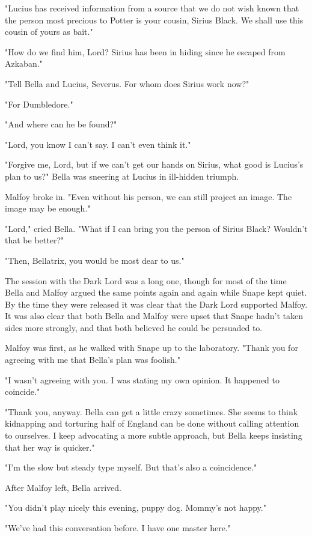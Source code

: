 \documentclass[a4paper,11pt]{article}
\begin{document}
"Lucius has received information from a source that we do not wish known that the person most precious to Potter is your cousin, Sirius Black. We shall use this cousin of yours as bait."

"How do we find him, Lord? Sirius has been in hiding since he escaped from Azkaban."

"Tell Bella and Lucius, Severus. For whom does Sirius work now?"

"For Dumbledore."

"And where can he be found?"

"Lord, you know I can't say. I can't even think it."

"Forgive me, Lord, but if we can't get our hands on Sirius, what good is Lucius's plan to us?" Bella was sneering at Lucius in ill-hidden triumph.

Malfoy broke in. "Even without his person, we can still project an image. The image may be enough."

"Lord," cried Bella. "What if I can bring you the person of Sirius Black? Wouldn't that be better?"

"Then, Bellatrix, you would be most dear to us."

The session with the Dark Lord was a long one, though for most of the time Bella and Malfoy argued the same points again and again while Snape kept quiet. By the time they were released it was clear that the Dark Lord supported Malfoy. It was also clear that both Bella and Malfoy were upset that Snape hadn't taken sides more strongly, and that both believed he could be persuaded to.

Malfoy was first, as he walked with Snape up to the laboratory. "Thank you for agreeing with me that Bella's plan was foolish."

"I wasn't agreeing with you. I was stating my own opinion. It happened to coincide."

"Thank you, anyway. Bella can get a little crazy sometimes. She seems to think kidnapping and torturing half of England can be done without calling attention to ourselves. I keep advocating a more subtle approach, but Bella keeps insisting that her way is quicker."

"I'm the slow but steady type myself. But that's also a coincidence."

After Malfoy left, Bella arrived.

"You didn't play nicely this evening, puppy dog. Mommy's not happy."

"We've had this conversation before. I have one master here."
\end{document}

